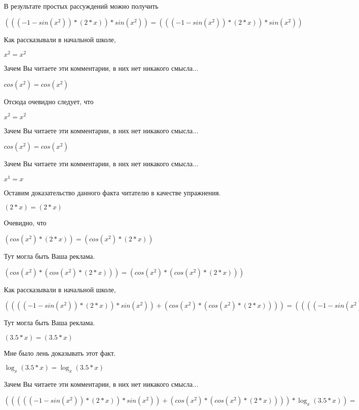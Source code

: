 \documentclass[12pt,a4paper,fleqn]{article}
\theoremstyle{definition}
\begin{document}
В результате простых рассуждений можно получить

$((( -1  - sin({ x }^{ 2 })) * ( 2  *  x )) * sin({ x }^{ 2 })) = ((( -1  - sin({ x }^{ 2 })) * ( 2  *  x )) * sin({ x }^{ 2 }))$

Как рассказывали в начальной школе,

${ x }^{ 2 } = { x }^{ 2 }$

Зачем Вы читаете эти комментарии, в них нет никакого смысла...

$cos({ x }^{ 2 }) = cos({ x }^{ 2 })$

Отсюда очевидно следует, что

${ x }^{ 2 } = { x }^{ 2 }$

Зачем Вы читаете эти комментарии, в них нет никакого смысла...

$cos({ x }^{ 2 }) = cos({ x }^{ 2 })$

Зачем Вы читаете эти комментарии, в них нет никакого смысла...

${ x }^{ 1 } =  x $

Оставим доказательство данного факта читателю в качестве упражнения.

$( 2  *  x ) = ( 2  *  x )$

Очевидно, что

$(cos({ x }^{ 2 }) * ( 2  *  x )) = (cos({ x }^{ 2 }) * ( 2  *  x ))$

Тут могла быть Ваша реклама.

$(cos({ x }^{ 2 }) * (cos({ x }^{ 2 }) * ( 2  *  x ))) = (cos({ x }^{ 2 }) * (cos({ x }^{ 2 }) * ( 2  *  x )))$

Как рассказывали в начальной школе,

$(((( -1  - sin({ x }^{ 2 })) * ( 2  *  x )) * sin({ x }^{ 2 })) + (cos({ x }^{ 2 }) * (cos({ x }^{ 2 }) * ( 2  *  x )))) = (((( -1  - sin({ x }^{ 2 })) * ( 2  *  x )) * sin({ x }^{ 2 })) + (cos({ x }^{ 2 }) * (cos({ x }^{ 2 }) * ( 2  *  x ))))$

Тут могла быть Ваша реклама.

$( 3.5  *  x ) = ( 3.5  *  x )$

Мне было лень доказывать этот факт.

$\log_{ x }{( 3.5  *  x )} = \log_{ x }{( 3.5  *  x )}$

Зачем Вы читаете эти комментарии, в них нет никакого смысла...

$((((( -1  - sin({ x }^{ 2 })) * ( 2  *  x )) * sin({ x }^{ 2 })) + (cos({ x }^{ 2 }) * (cos({ x }^{ 2 }) * ( 2  *  x )))) * \log_{ x }{( 3.5  *  x )}) = ((((( -1  - sin({ x }^{ 2 })) * ( 2  *  x )) * sin({ x }^{ 2 })) + (cos({ x }^{ 2 }) * (cos({ x }^{ 2 }) * ( 2  *  x )))) * \log_{ x }{( 3.5  *  x )})$
\end{document}
